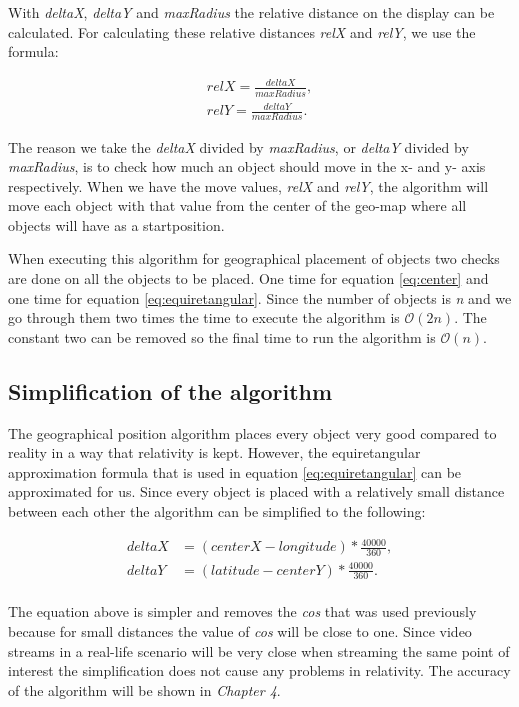 With \textit{deltaX}, \textit{deltaY} and \textit{maxRadius} the relative distance on the display can be calculated. For calculating these relative distances \textit{relX} and \textit{relY}, we use the formula:

\begin{align*}
\label{eq:2}
relX = \frac{deltaX}{maxRadius}, \\
relY = \frac{deltaY}{maxRadius}.
\end{align*}

The reason we take the \textit{deltaX} divided by \textit{maxRadius}, or \textit{deltaY} divided by \textit{maxRadius}, is to check how much an object should move in the x- and y- axis respectively. When we have the move values, \textit{relX} and \textit{relY}, the algorithm will move each object with that value from the center of the geo-map where all objects will have as a startposition. 

When executing this algorithm for geographical placement of objects two checks are done on all the objects to be placed. One time for equation \ref{eq:center} and one time for equation \ref{eq:equiretangular}. Since the number of objects is \textit{n} and we go through them two times the time to execute the algorithm is $\mathcal{O}(2n)$. The constant two can be removed so the final time to run the algorithm is $\mathcal{O}(n)$.



\subsection{Simplification of the algorithm}
\label{sec:limacc}

The geographical position algorithm places every object very good compared to reality in a way that relativity is kept. However, the equiretangular approximation formula that is used in equation \ref{eq:equiretangular} can be approximated for us. Since every object is placed with a relatively small distance between each other the algorithm can be simplified to the following: 

\begin{align*}
deltaX &= (centerX-longitude)*\frac{40000}{360}, \\
deltaY &= (latitude-centerY)*\frac{40000}{360}. \\
\end{align*}

The equation above is simpler and removes the \textit{cos} that was used previously because for small distances the value of \textit{cos} will be close to one. Since video streams in a real-life scenario will be very close when streaming the same point of interest the simplification does not cause any problems in relativity. The accuracy of the algorithm will be shown in \textit{Chapter 4}.

